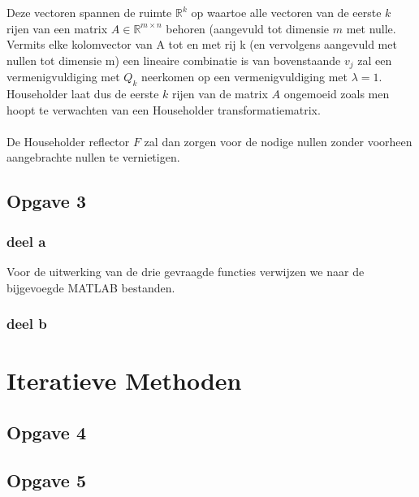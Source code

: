 \documentclass[een]{practicumverslag}
\begin{document}
Deze vectoren spannen de ruimte $\mathbb{R}^k$ op waartoe alle vectoren
van de eerste $k$ rijen van een matrix $A \in \mathbb{R}^{m \times n}$ behoren (aangevuld tot dimensie $m$ met nulle. 
Vermits elke kolomvector van A tot en met rij k (en vervolgens aangevuld met nullen tot dimensie m) een lineaire combinatie is van bovenstaande $v_j$ zal een vermenigvuldiging met $Q_k$ neerkomen op een vermenigvuldiging met $\lambda = 1$. Householder laat dus de eerste $k$ rijen van de matrix $A$ ongemoeid zoals men hoopt te verwachten van een Householder transformatiematrix.\\
\\
De Householder reflector $F$ zal dan zorgen voor de nodige nullen zonder voorheen aangebrachte nullen te vernietigen.

\pagebreak
\subsection*{Opgave 3}

\subsubsection{deel a}

Voor de uitwerking van de drie gevraagde functies verwijzen we naar de bijgevoegde MATLAB bestanden.

\subsubsection{deel b}

\lipsum[9-9]

\section{Iteratieve Methoden}

\subsection*{Opgave 4}

\lipsum[3-3]

\subsection*{Opgave 5}

\subsubsection{}
\end{document}
